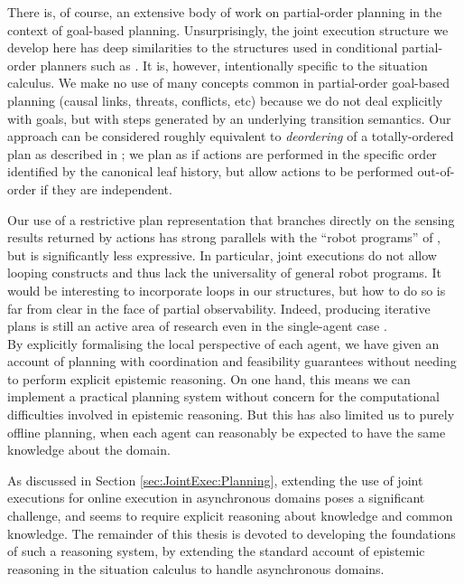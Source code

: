 There is, of course, an extensive body of work on partial-order planning
in the context of goal-based planning. Unsurprisingly, the joint execution
structure we develop here has deep similarities to the structures
used in conditional partial-order planners such as \citep{peot92conditional_nonlinear}.
It is, however, intentionally specific to the situation calculus.
We make no use of many concepts common in partial-order goal-based
planning (causal links, threats, conflicts, etc) because we do not
deal explicitly with goals, but with steps generated by an underlying
transition semantics. Our approach can be considered roughly equivalent
to \emph{deordering} of a totally-ordered plan as described in \citep{backstrom99reordering};
we plan as if actions are performed in the specific order identified
by the canonical leaf history, but allow actions to be performed out-of-order
if they are independent.

Our use of a restrictive plan representation that branches directly
on the sensing results returned by actions has strong parallels with
the {}``robot programs'' of \citep{levesque96what_is_planning,levesque98what_robots_can_do},
but is significantly less expressive. In particular, joint executions
do not allow looping constructs and thus lack the universality of
general robot programs. It would be interesting to incorporate loops
in our structures, but how to do so is far from clear in the face
of partial observability. Indeed, producing iterative plans is still
an active area of research even in the single-agent case \citep{levesque05planning_with_loops}.\\


By explicitly formalising the local perspective of each agent, we
have given an account of planning with coordination and feasibility
guarantees without needing to perform explicit epistemic reasoning.
On one hand, this means we can implement a practical planning
system without concern for the computational difficulties involved
in epistemic reasoning. But this has also limited us to purely offline
planning, when each agent can reasonably be expected to have the same
knowledge about the domain.

As discussed in Section \ref{sec:JointExec:Planning}, extending the
use of joint executions for online execution in asynchronous domains
poses a significant challenge, and seems to require explicit reasoning
about knowledge and common knowledge. The remainder of this thesis
is devoted to developing the foundations of such a reasoning system,
by extending the standard account of epistemic reasoning in the situation
calculus to handle asynchronous domains.


